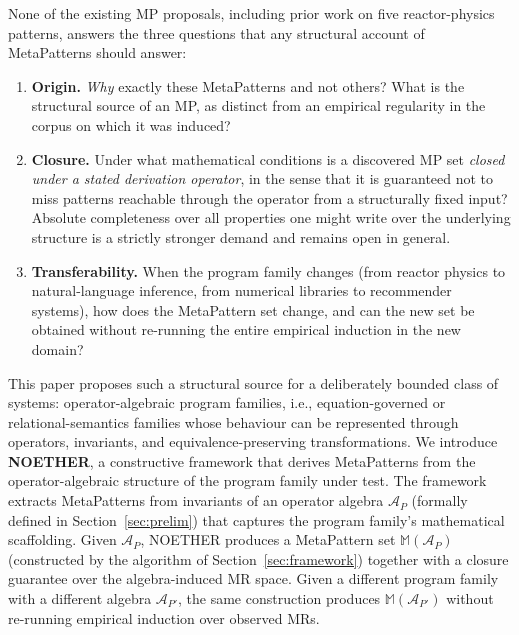 \documentclass[manuscript]{acmart}
\begin{document}
None of the existing MP proposals, including prior work on five reactor-physics patterns, answers the three questions that any structural account of MetaPatterns should answer:

\begin{enumerate}
  \item \textbf{Origin.} \emph{Why} exactly these MetaPatterns and not others? What is the structural source of an MP, as distinct from an empirical regularity in the corpus on which it was induced?
  \item \textbf{Closure.} Under what mathematical conditions is a discovered MP set \emph{closed under a stated derivation operator}, in the sense that it is guaranteed not to miss patterns reachable through the operator from a structurally fixed input? Absolute completeness over all properties one might write over the underlying structure is a strictly stronger demand and remains open in general.
  \item \textbf{Transferability.} When the program family changes (from reactor physics to natural-language inference, from numerical libraries to recommender systems), how does the MetaPattern set change, and can the new set be obtained without re-running the entire empirical induction in the new domain?
\end{enumerate}

This paper proposes such a structural source for a deliberately bounded class of systems: operator-algebraic program families, i.e., equation-governed or relational-semantics families whose behaviour can be represented through operators, invariants, and equivalence-preserving transformations. We introduce \textbf{NOETHER}, a constructive framework that derives MetaPatterns from the operator-algebraic structure of the program family under test. The framework extracts MetaPatterns from invariants of an operator algebra $\mathcal{A}_P$ (formally defined in Section~\ref{sec:prelim}) that captures the program family's mathematical scaffolding. Given $\mathcal{A}_P$, NOETHER produces a MetaPattern set $\mathbb{M}(\mathcal{A}_P)$ (constructed by the algorithm of Section~\ref{sec:framework}) together with a closure guarantee over the algebra-induced MR space. Given a different program family with a different algebra $\mathcal{A}_{P'}$, the same construction produces $\mathbb{M}(\mathcal{A}_{P'})$ without re-running empirical induction over observed MRs.
\end{document}
